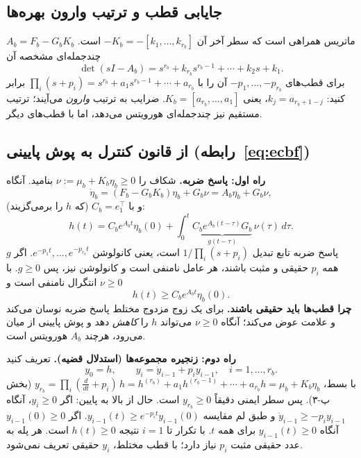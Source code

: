 \documentclass[10pt,twocolumn]{article}
\begin{document}
\subsection{جایابی قطب و ترتیب وارون بهره‌ها}
$A_b=F_b-G_bK_b$ ماتریس همراهی است که سطر آخر آن $-K_b=-[k_1,\ldots,k_{r_b}]$ است. چندجمله‌ای
مشخصه آن
\begin{equation*}
    \det(sI-A_b)=s^{r_b}+k_{r_b}s^{r_b-1}+\cdots+k_2s+k_1 .
\end{equation*}
برای قطب‌های $-p_1,\ldots,-p_{r_b}$ آن را با
$\prod_i(s+p_i)=s^{r_b}+a_1s^{r_b-1}+\cdots+a_{r_b}$ برابر کنید: $k_j=a_{r_b+1-j}$، یعنی
$K_b=[a_{r_b},\ldots,a_1]$. ضرایب به ترتیب \emph{وارون} می‌آیند؛ ترتیب مستقیم نیز چندجمله‌ای
هورویتس می‌دهد، اما با قطب‌های دیگر.

\subsection{از قانون کنترل به پوش پایینی (رابطه~\eqref{eq:ecbf})}
\textbf{راه اول: پاسخ ضربه.} شکاف را $\nu:=\mu_b+K_b\eta_b\ge0$ بنامید. آنگاه
\begin{equation*}
    \dot\eta_b=(F_b-G_bK_b)\eta_b+G_b\nu=A_b\eta_b+G_b\nu ,
\end{equation*}
و با $C_b=e_1^{\top}$ (که $h$ را برمی‌گزیند):
\begin{equation*}
    h(t)=C_be^{A_bt}\eta_b(0)+\int_0^t\underbrace{C_be^{A_b(t-\tau)}G_b}_{g(t-\tau)}\,\nu(\tau)\,d\tau .
\end{equation*}
$g$ پاسخ ضربه تابع تبدیل $1/\prod_i(s+p_i)$ است، یعنی کانولوشن $e^{-p_1t},\ldots,e^{-p_{r_b}t}$. اگر
همه $p_i$ حقیقی و مثبت باشند، هر عامل نامنفی است و کانولوشن نیز، پس $g\ge0$. با $\nu\ge0$ انتگرال
نامنفی است و
\begin{equation*}
    h(t)\ge C_be^{A_bt}\eta_b(0).
\end{equation*}
\textbf{چرا قطب‌ها باید حقیقی باشند.} برای یک زوج مزدوج مختلط پاسخ ضربه نوسان می‌کند و علامت
عوض می‌کند؛ آنگاه $\nu\ge0$ می‌تواند $h$ را \emph{کاهش} دهد و پوش پایینی از میان می‌رود، هرچند
$A_b$ هورویتس است.

\textbf{راه دوم: زنجیره مجموعه‌ها (استدلال قضیه).} تعریف کنید
\begin{equation*}
    y_0=h,\qquad y_i=\dot y_{i-1}+p_iy_{i-1},\quad i=1,\ldots,r_b .
\end{equation*}
با بسط، $y_{r_b}=\prod_i(\tfrac{d}{dt}+p_i)\,h=h^{(r_b)}+a_1h^{(r_b-1)}+\cdots+a_{r_b}h=\mu_b+K_b\eta_b$
(بخش پ-۳). پس سطر ایمنی دقیقاً $y_{r_b}\ge0$ است. حال از بالا به پایین:
اگر $y_i\ge0$، آنگاه $\dot y_{i-1}\ge-p_iy_{i-1}$ و طبق لم مقایسه
$y_{i-1}(t)\ge e^{-p_it}y_{i-1}(0)$. اگر $y_{i-1}(0)\ge0$ آنگاه $y_{i-1}(t)\ge0$ برای همه $t$. با
تکرار تا $i=1$ نتیجه $h(t)\ge0$ است. هر پله به عدد حقیقی مثبت $p_i$ نیاز دارد؛ با قطب مختلط،
$y_i$ حقیقی تعریف نمی‌شود.
\end{document}

